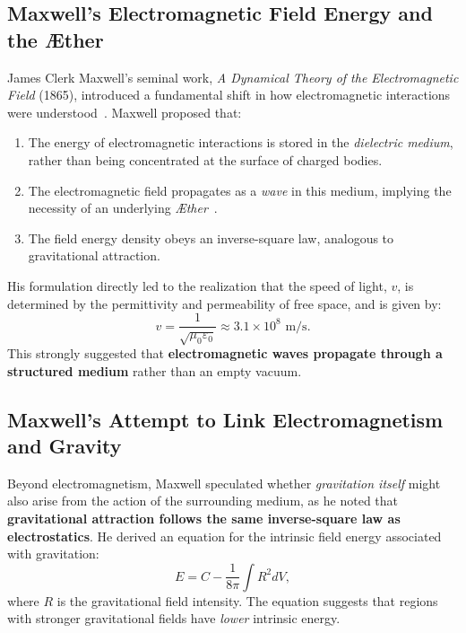 \documentclass[a4paper,10pt]{article}
\begin{document}
\subsection*{Maxwell's Electromagnetic Field Energy and the Æther}
James Clerk Maxwell's seminal work, \textit{A Dynamical Theory of the Electromagnetic Field} (1865), introduced a fundamental shift in how electromagnetic interactions were understood~\cite{maxwell1865}. Maxwell proposed that:
\begin{enumerate}
    \item The energy of electromagnetic interactions is stored in the \textit{dielectric medium}, rather than being concentrated at the surface of charged bodies.
    \item The electromagnetic field propagates as a \textit{wave} in this medium, implying the necessity of an underlying \textit{Æther}~\cite{hertz1893, lorentz1895}.
    \item The field energy density obeys an inverse-square law, analogous to gravitational attraction.
\end{enumerate}

His formulation directly led to the realization that the speed of light, \( v \), is determined by the permittivity and permeability of free space, and is given by:
\begin{equation*}
    v = \frac{1}{\sqrt{\mu_0 \varepsilon_0}} \approx 3.1 \times 10^8 \text{ m/s}.
\end{equation*}
This strongly suggested that \textbf{electromagnetic waves propagate through a structured medium} rather than an empty vacuum.

\subsection*{Maxwell's Attempt to Link Electromagnetism and Gravity}
Beyond electromagnetism, Maxwell speculated whether \textit{gravitation itself} might also arise from the action of the surrounding medium, as he noted that \textbf{gravitational attraction follows the same inverse-square law as electrostatics}. He derived an equation for the intrinsic field energy associated with gravitation:
\begin{equation*}
    E = C - \frac{1}{8\pi} \int R^2 dV,
\end{equation*}
where \( R \) is the gravitational field intensity. The equation suggests that regions with stronger gravitational fields have \textit{lower} intrinsic energy.
\end{document}
